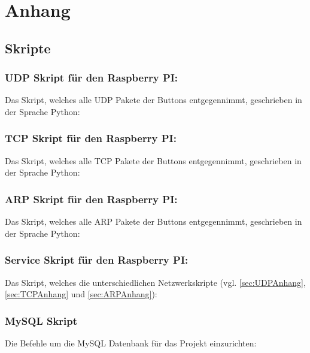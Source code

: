\section{Anhang}
\subsection{Skripte}
\label{sec:Skripte-1} 

\subsubsection{UDP Skript für den Raspberry PI:}$\;$ \\  
\label{sec:UDPAnhang}
Das Skript, welches alle UDP Pakete der Buttons entgegennimmt, geschrieben in der Sprache Python:

\newpage

\subsubsection{TCP Skript für den Raspberry PI:}$\;$ \\  
\label{sec:TCPAnhang}
Das Skript, welches alle TCP Pakete der Buttons entgegennimmt, geschrieben in der Sprache Python:

\newpage

\subsubsection{ARP Skript für den Raspberry PI:}$\;$ \\  
\label{sec:ARPAnhang}
Das Skript, welches alle ARP Pakete der Buttons entgegennimmt, geschrieben in der Sprache Python:

\newpage

\subsubsection{Service Skript für den Raspberry PI:}$\;$ \\
\label{sec:ServiceAnhang}
Das Skript, welches die unterschiedlichen Netzwerkskripte (vgl. \ref{sec:UDPAnhang}, \ref{sec:TCPAnhang} und \ref{sec:ARPAnhang}):

\newpage

\subsubsection{MySQL Skript}
\label{sec:MySQLSkript}
Die Befehle um die MySQL Datenbank für das Projekt einzurichten: 

\newpage 

